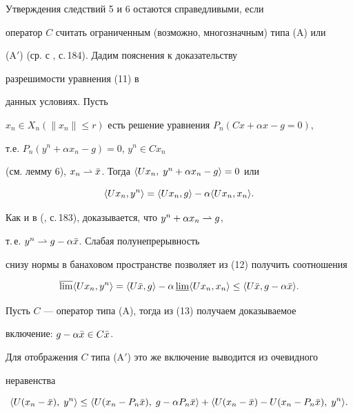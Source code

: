 \begin{note} Утверждения следствий 5 и 6 остаются справедливыми, если 


оператор $C$ считать ограниченным (возможно, многозначным) типа (A) или 


(A$'$) (ср. с \cite{Lio}, с.\,184). Дадим пояснения к доказательству 


разрешимости уравнения (11) в 


данных условиях. Пусть 


$x_n\in X_n(\|x_n\|\le r)$ есть решение уравнения $P_n(Cx+\alpha x-g=0)$, 


т.е. $P_n(y^n+\alpha x_n-g)=0$, $y^n\in Cx_n$ 


(см. лемму 6), $x_n\rightharpoonup\Bar x$. Тогда $\langle Ux_n,\;y^n+\alpha x_n-g\rangle=0$ или 


\begin{equation} 


\la Ux_n,y^n\ra = \la Ux_n,g\ra -\alpha\la Ux_n,x_n\ra . 


\end{equation} 


Как и в (\cite{Lio}, с.\,183), доказывается, что $y^n+\alpha x_n\rightharpoonup g$, 


т.\,е. $y^n\rightharpoonup g-\alpha\Bar x$. Слабая полунепрерыв\-ность 


снизу нормы в банаховом пространстве позволяет из (12) получить соотношения 


\begin{equation} 


\overline{\lim}\la Ux_n,y^n\ra =\la U\Bar x,g\ra- \alpha\,


\underline{\lim}\la Ux_n,x_n\ra\le \la U\Bar x,g-\alpha\Bar x\ra . 


\end{equation} 


Пусть $C$ --- оператор типа (A), тогда из (13) получаем доказываемое 


включение: $g-\alpha\Bar x\in C\Bar x$. 


Для отображения $C$ типа (A$'$) это же включение выводится из очевидного 


неравенства 


$$ 


\la U(x_n-\Bar x),\;y^n\ra \le \la U(x_n-P_n\Bar x),\;g-\alpha P_n\Bar x\ra 


+\la U(x_n-\Bar x)-U(x_n-P_n\Bar x),\;y^n\ra .


$$ 


\end{note} 


